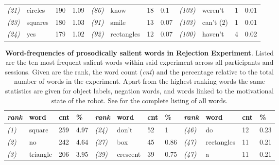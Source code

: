 \begin{screenonly}
\begin{table*}[h]
\begin{tabular*}{\hsize}{@{\extracolsep{\fill}}llllllllllll}
    \textsl{(21)} & circles & 190 & 1.09 & \hspace*{2ex}\textsl{(86)} & know & 18 & 0.1 & \hspace*{2ex}\textsl{(103)} & weren't & 1 & 0.01\\
    \textsl{(23)} & squares & 180 & 1.03 & \hspace*{2ex}\textsl{(91)} & smile & 13 & 0.07 & \hspace*{2ex}\textsl{(103)} & can't (2) & 1 & 0.01\\
    \textsl{(24)} & yes & 179 & 1.02 & \hspace*{2ex}\textsl{(92)} & rectangles & 12 & 0.07 & \hspace*{2ex}\textsl{(100)} & haven't & 4 & 0.02\\
    \bottomrule
  \end{tabular*}
\end{table*}
\begin{table*}[h]
\caption{\textbf{Word-frequencies of prosodically salient words in Rejection Experiment}. Listed are the ten most frequent salient words
    within said experiment across all participants and sessions. Given are the rank, the word count (\emph{cnt}) and the percentage relative
    to the total number of words in the experiment. Apart from the highest-ranking words the same statistics are given for object labels, negation
    words, and words linked to the motivational state of the robot. See \cite{Foerster2013} for the complete listing of all words.}
  \label{tbl_wf_rs}
  \begin{tabular*}{\hsize}{@{\extracolsep{\fill}}llllllllllll}
    \textsl{rank} & word & cnt & \% & \hspace*{2ex}\textsl{rank} & word & cnt & \% & \hspace*{2ex}\textsl{rank} & word & cnt & \%\\
    \toprule
    \textsl{(1)} & square & 259 & 4.97 & \hspace*{2ex}\textsl{(24)} & don't & 52 & 1 & \hspace*{2ex}\textsl{(46)} & do & 12 & 0.23\\
    \textsl{(2)} & no & 242 & 4.64 & \hspace*{2ex}\textsl{(27)} & box & 45 & 0.86 & \hspace*{2ex}\textsl{(47)} & rectangles & 11 & 0.21\\
    \textsl{(3)} & triangle & 206 & 3.95 & \hspace*{2ex}\textsl{(29)} & crescent & 39 & 0.75 & \hspace*{2ex}\textsl{(47)} & a & 11 & 0.21\\

\end{tabular*}
\end{table*}
\end{screenonly}
